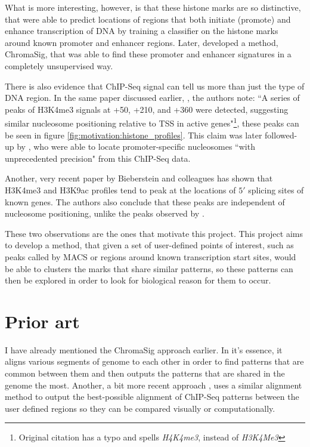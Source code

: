 \documentclass[parskip]{cs4rep}
\newcommand{\histonemodification}[1]{#1}
\begin{document}
What is more interesting, however, is that these histone marks are so distinctive, that 
\cite{Heintzman:2007ke} were able to predict locations of regions that both initiate (promote) and enhance transcription of DNA by training a classifier on the histone marks around known promoter and enhancer regions. Later, \cite{Hon:2008wv} developed a method, ChromaSig, that was able to find these promoter and enhancer signatures in a completely unsupervised way.

There is also evidence that ChIP-Seq signal can tell us more than just the type of DNA region. In the same paper discussed earlier, \cite{Barski:2007ww}, the authors note: ``A series of peaks of H3K4me3 signals at +50, +210, and +360 were detected, suggesting similar nucleosome positioning relative to TSS in active genes"\footnote{Original citation has a typo and spells \emph{H4K4me3}, instead of \emph{H3K4Me3}}, these peaks can be seen in figure \autoref{fig:motivation:histone_profiles}. 
This claim was later followed-up by \cite{Schmid:2007ue}, who were able to locate promoter-specific nucleosomes ``with unprecedented precision" from this ChIP-Seq data. 

Another, very recent paper by Bieberstein and colleagues\cite{Bieberstein:2012tf} has shown that \histonemodification{H3K4me3} and \histonemodification{H3K9ac} profiles tend to peak at the locations of $5'$ splicing sites of known genes. The authors also conclude that these peaks are independent of nucleosome positioning, unlike the peaks observed by \cite{Barski:2007ww}.

These two observations are the ones that motivate this project. This project aims to develop a method, that given a set of user-defined points of interest, such as peaks called by MACS or regions around known transcription start sites, would be able to clusters the marks that share similar patterns, so these patterns can then be explored in order to look for biological reason for them to occur.

\section{Prior art}

I have already mentioned the ChromaSig\cite{Hon:2008wv} approach earlier. In it's essence, it aligns various segments of genome to each other in order to find patterns that are common between them and then outputs the patterns that are shared in the genome the most. Another, a bit more recent approach \cite{Lai:2010ue}, uses a similar alignment method to output the best-possible alignment of ChIP-Seq patterns between the user defined regions so they can be compared visually or computationally.
\end{document}
